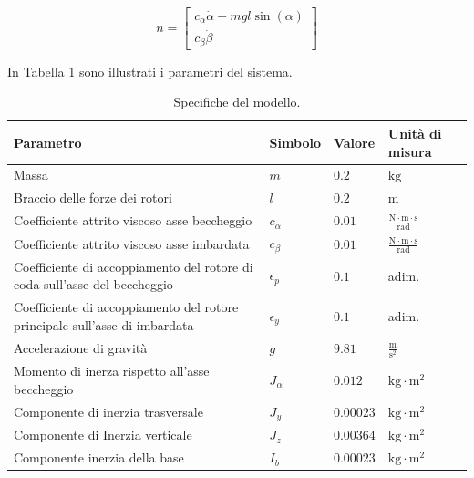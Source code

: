 \documentclass[12pt,a4paper]{article}
\begin{document}
\begin{equation}
    n =
    \begin{bmatrix}
        c_{\alpha}\dot{\alpha} + mgl\sin(\alpha)    \\
        c_{\beta}\dot{\beta}
    \end{bmatrix}
\end{equation}

In Tabella \ref{tab:Parametri} sono illustrati i parametri del sistema.

\begin{table}[H]
\centering
\caption{Specifiche del modello.}
\label{tab:Parametri}
\begin{tabular}{|>{\centering\arraybackslash}m{4.2cm}|>{\centering\arraybackslash}m{2.2cm}|>{\centering\arraybackslash}m{2.2cm}|>{\centering\arraybackslash}m{3cm}|}
\hline
\textbf{Parametro} & \textbf{Simbolo} & \textbf{Valore} & \textbf{Unità di misura} \\
\hline
Massa & $m$ & $0.2$ & $\text{kg}$ \\
\hline
Braccio delle forze dei rotori & $l$ & $0.2$ & $\text{m}$ \\
\hline
Coefficiente attrito viscoso asse beccheggio & $c_{\alpha}$ & $0.01$ & $\frac{\text{N}\cdot\text{m}\cdot\text{s}}{\text{rad}}$ \\
\hline
Coefficiente attrito viscoso asse imbardata & $c_{\beta}$ & $0.01$ & $\frac{\text{N}\cdot\text{m}\cdot\text{s}}{\text{rad}}$ \\
\hline
Coefficiente di accoppiamento del rotore di coda sull'asse del beccheggio & $\epsilon_p$ & $0.1$ & adim. \\
\hline
Coefficiente di accoppiamento del rotore principale sull'asse di imbardata & $\epsilon_y$ & $0.1$ & adim. \\
\hline
Accelerazione di gravità & $g$ & $9.81$ & $\frac{\text{m}}{\text{s}^2}$ \\
\hline
Momento di inerza rispetto all'asse beccheggio & $J_{\alpha}$ & $0.012$ & $\text{kg}\cdot\text{m}^2$ \\
\hline
Componente di inerzia trasversale & $J_y$ & $0.00023$ & $\text{kg}\cdot\text{m}^2$ \\
\hline
Componente di Inerzia verticale & $J_z$ & $0.00364$ & $\text{kg}\cdot\text{m}^2$ \\
\hline
Componente inerzia della base & $I_b$ & $0.00023$ & $\text{kg}\cdot\text{m}^2$ \\
\hline
\end{tabular}
\end{table}
\end{document}
